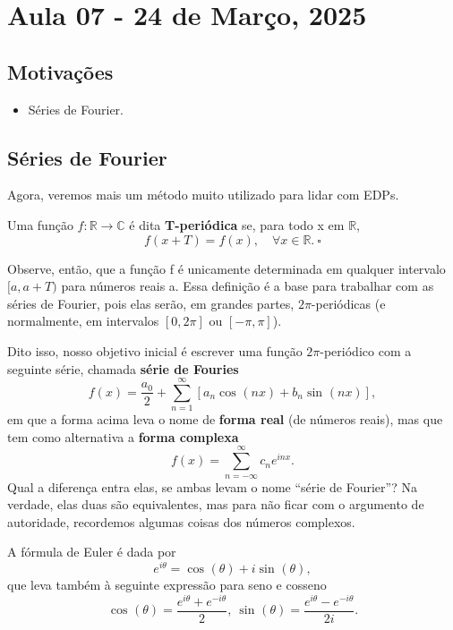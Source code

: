 \documentclass[../pde_notes.tex]{subfiles}
\begin{document}
\section{Aula 07 - 24 de Março, 2025}
\subsection{Motivações}
\begin{itemize}
	\item Séries de Fourier.
\end{itemize}
\subsection{Séries de Fourier}
Agora, veremos mais um método muito utilizado para lidar com EDPs.
\begin{def*}
	Uma função \(f:\mathbb{R}\rightarrow \mathbb{C}\) é dita \textbf{T-periódica} se, para todo x em \(\mathbb{R}\),
	\[
		f(x + T) = f(x),\quad \forall x\in \mathbb{R}.\: \square
	\]
\end{def*}
Observe, então, que a função f é unicamente determinada em qualquer intervalo \([a, a+T)\) para números reais a. Essa definição é a base para trabalhar com as séries de Fourier, pois elas serão, em grandes partes, \(2\pi \)-periódicas (e normalmente, em intervalos \([0, 2\pi ]\) ou \([-\pi , \pi ]\)).

Dito isso, nosso objetivo inicial é escrever uma função \(2\pi \)-periódico com a seguinte série, chamada \textbf{série de Fouries}
\[
	f(x) = \frac{a_{0}}{2} + \sum\limits_{n=1}^{\infty}[a_{n}\cos^{}{(nx)} + b_{n}\sin^{}{(nx)}],
\]
em que a forma acima leva o nome de \textbf{forma real} (de números reais), mas que tem como alternativa a \textbf{forma complexa}
\[
	f(x) = \sum\limits_{n=-\infty}^{\infty}c_{n}e^{inx}.
\]
Qual a diferença entra elas, se ambas levam o nome ``série de Fourier''? Na verdade, elas duas são equivalentes, mas para não ficar com o argumento de autoridade, recordemos algumas coisas dos números complexos.
\begin{tcolorbox}[
		skin=enhanced,
		title=Lembrete!,
		after title={\hfill Fórmula de Euler},
		fonttitle=\bfseries,
		sharp corners=downhill,
		colframe=black,
		colbacktitle=yellow!75!white,
		colback=yellow!30,
		colbacklower=black,
		coltitle=black,
		drop large lifted shadow
	]
	A \hypertarget{euler_formula}{fórmula de Euler} é dada por
	\[
		e^{i\theta }=\cos^{}{(\theta )} + i \sin^{}{(\theta )},
	\]
	que leva também à seguinte expressão para seno e cosseno
	\[
		\cos^{}{(\theta )} = \frac{e^{i\theta }+e^{-i\theta }}{2},\: \sin^{}{(\theta )} = \frac{e^{i\theta }-e^{-i\theta }}{2i}.
	\]
\end{tcolorbox}
\end{document}
